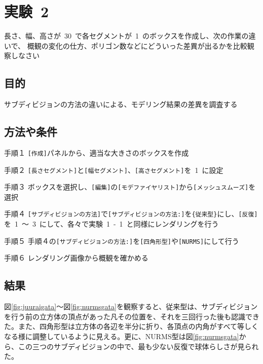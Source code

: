 \documentclass[a4j]{jarticle}
\begin{document}
\newpage
\section{実験\ 2}
長さ、幅、高さが\ 30\ で各セグメントが\ 1\ のボックスを作成し、次の作業の違いで、
概観の変化の仕方、ポリゴン数などにどういった差異が出るかを比較観察しなさい
\subsection{目的}
%
サブディビジョンの方法の違いによる、モデリング結果の差異を調査する
%
\subsection{方法や条件}
%
\begin{description}
\item{手順１} \verb|[作成]|パネルから、適当な大きさのボックスを作成
\item{手順２} \verb|[長さセグメント]|と\verb|[幅セグメント]|、\verb|[高さセグメント]|を\ 1\ に設定
\item{手順３} ボックスを選択し、\verb|[編集]|の\verb|[モデファイヤリスト]|から\verb|[メッシュスムーズ]|を選択
\item{手順４} \verb|[サブディビジョンの方法]|で\verb|[サブディビジョンの方法:]|を\verb|{従来型}|にし、\verb|[反復]|を\ 1\ ～\ 3\ にして、各々で実験\ 1\ -\ 1\ と同様にレンダリングを行う
\item{手順５} 手順４の\verb|[サブディビジョンの方法:]|を\verb|[四角形型]|や\verb|[NURMS]|にして行う
\item{手順６} レンダリング画像から概観を確かめる
\end{description}
%
\subsection{結果}
%
図\ref{fig:juuraigata}～図\ref{fig:nurmsgata}を観察すると、従来型は、サブディビジョンを行う前の立方体の頂点があった凡その位置を、それを三回行った後も認識できた。また、四角形型は立方体の各辺を半分に折り、各頂点の内角がすべて等しくなる様に調整しているように見える。更に、NURMS型は図\ref{fig:nurmsgata}から、この三つのサブディビジョンの中で、最も少ない反復で球体らしさが見られた。
\end{document}
